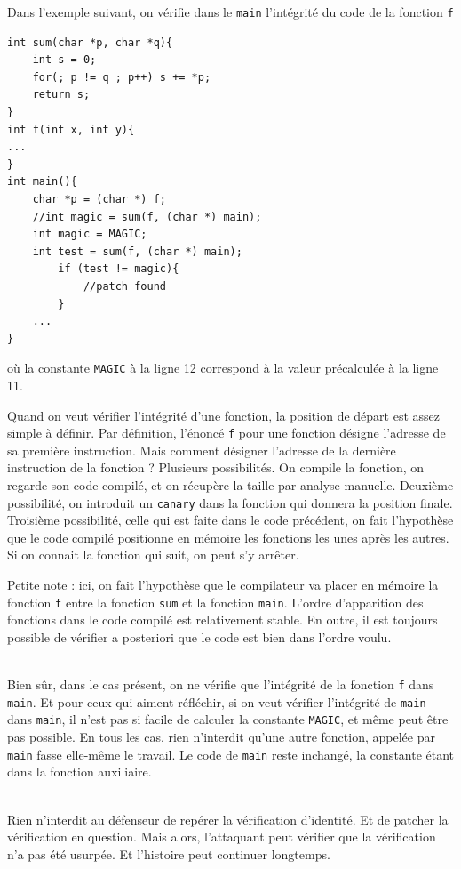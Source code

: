 \documentclass{book}
\newenvironment{commentaire}[1]{%
	\def\FrameCommand{\fboxrule=\FrameRule\fboxsep=\FrameSep \fcolorbox{yellow!50}{yellow!10}}%
	\MakeFramed {\advance\hsize-\width \FrameRestore}
	\noindent {\bf #1}\\
}%
{\endMakeFramed}
\begin{document}
Dans l'exemple suivant, on vérifie dans le {\tt main} l'intégrité du code de la fonction {\tt f}
\begin{verbatim}
int sum(char *p, char *q){
	int s = 0; 
	for(; p != q ; p++) s += *p;
	return s;
}
int f(int x, int y){
...
}
int main(){
	char *p = (char *) f;
	//int magic = sum(f, (char *) main);
	int magic = MAGIC;
	int test = sum(f, (char *) main);
        if (test != magic){
        	//patch found
        } 
	...
}
\end{verbatim}
où la constante  {\tt MAGIC} à la ligne 12 correspond à la valeur  précalculée à la ligne 11. 

Quand on veut vérifier l'intégrité d'une fonction, la position de départ est assez simple à définir. Par définition, l'énoncé {\tt f} pour une fonction désigne l'adresse de sa première instruction. Mais comment désigner l'adresse de la dernière instruction de la fonction ? Plusieurs possibilités. On compile la fonction, on regarde son code compilé, et on récupère la taille par analyse manuelle. Deuxième possibilité, on introduit un {\tt canary} dans la fonction qui donnera la position finale. Troisième possibilité, celle qui est faite dans le code précédent, on fait l'hypothèse que le code compilé positionne en mémoire les fonctions les unes après les autres. Si on connait la fonction qui suit, on peut s'y arrêter.

Petite note : ici, on fait l'hypothèse que le compilateur va placer en mémoire la fonction {\tt f} entre la fonction {\tt sum} et la fonction {\tt main}. L'ordre d'apparition des fonctions dans le code compilé est relativement stable. En outre, il est toujours possible de vérifier a posteriori que le code est bien dans l'ordre voulu. 

\begin{commentaire}{Se vérifier soi-même}
Bien sûr, dans le cas présent, on ne vérifie que l'intégrité de la fonction {\tt f} dans {\tt main}. Et pour ceux qui aiment réfléchir, si on veut vérifier l'intégrité de {\tt main} dans {\tt main}, il n'est pas si facile de calculer la constante {\tt MAGIC}, et même peut être pas possible. En tous les cas, rien n'interdit qu'une autre fonction, appelée par {\tt main} fasse elle-même le travail. Le code de {\tt main} reste inchangé, la constante étant dans la fonction auxiliaire. 
\end{commentaire}

\begin{commentaire}{Tromper la vérification}
Rien n'interdit au défenseur de repérer la vérification d'identité. Et de patcher la vérification en question. Mais alors, l'attaquant peut vérifier que la vérification n'a pas été usurpée. Et l'histoire peut continuer longtemps. 
\end{commentaire}
\end{document}
